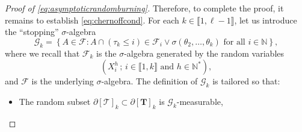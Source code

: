 \documentclass[a4paper,11pt]{article}
\begin{document}
\begin{proof}[Proof of \eqref{eq:asymptoticrandomburning}]
Therefore, to complete the proof, it remains to establish \eqref{eq:chernoffcond}.
For each $k\in\llbracket1,\ell-1\rrbracket$, let us introduce the ``stopping'' $\sigma$-algebra
\[\mathcal{G}_k=\left\{A\in\mathcal{F}:\text{$A\cap(\tau_k\leq i)\in\mathcal{F}_i\vee\sigma(\theta_2,\ldots,\theta_k)$ for all $i\in\mathbb{N}$}\right\},\]
where we recall that $\mathcal{F}_k$ is the $\sigma$-algebra generated by the random variables
\[\left(X_i^h\,;\,\text{$i\in\llbracket1,k\rrbracket$ and $h\in\mathbb{N}^*$}\right),\]
and $\mathcal{F}$ is the underlying $\sigma$-algebra.
The definition of $\mathcal{G}_k$ is tailored so that:
\begin{itemize}
\item The random subset $\partial[\mathcal{T}]_k\subset\partial[\mathbf{T}]_k$ is $\mathcal{G}_k$-measurable,


\end{itemize}
\end{proof}
\end{document}

